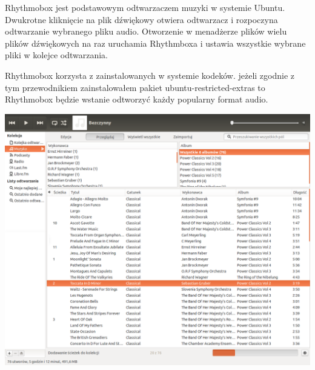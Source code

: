 Rhythmobox jest podstawowym odtwarzaczem muzyki w systemie Ubuntu. Dwukrotne kliknięcie na plik dźwiękowy otwiera odtwarzacz i rozpoczyna odtwarzanie wybranego pliku audio. Otworzenie w menadżerze plików wielu plików dźwiękowych na raz uruchamia Rhythmboxa i ustawia wszystkie wybrane pliki w kolejce odtwarzania.

Rhythmobox korzysta z zainstalowanych w systemie kodeków. jeżeli zgodnie z tym przewodnikiem zainstalowałem pakiet \textcolor{ubuntu_orange}{ubuntu-restricted-extras} to Rhythmobox będzie wstanie odtworzyć każdy popularny format audio.
\begin{center}
	\includegraphics[width=\linewidth]{images/programy_rhythmbox1.png}
\end{center}

